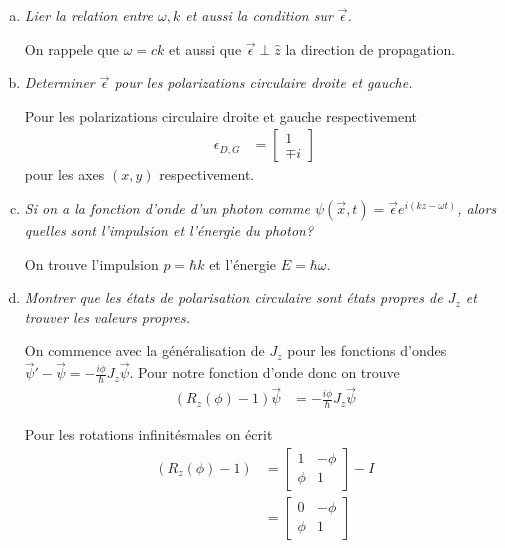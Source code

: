 \documentclass[10pt]{report}
\begin{document}
\begin{enumerate}[a)]
    \item \emph{Lier la relation entre $\omega,k$ et aussi la condition sur $\vec{\epsilon}$.}

        On rappele que $\omega = ck$ et aussi que $\vec{\epsilon} \perp \hat{z}$ la direction de propagation.
    \item \emph{Determiner $\vec{\epsilon}$ pour les polarizations circulaire droite et gauche.}

        Pour les polarizations circulaire droite et gauche respectivement
        \begin{align}
            \epsilon_{D,G} &= \begin{bmatrix} 1 \\ \mp i \end{bmatrix} 
        \end{align}
        pour les axes $(x,y)$ respectivement.

    \item \emph{Si on a la fonction d'onde d'un photon comme $\psi(\vec{x},t) = \vec{\epsilon}e^{i(kz - \omega t)}$, alors quelles sont l'impulsion et l'\'energie du photon?}

        On trouve l'impulsion $p = \hbar k$ et l'\'energie $E = \hbar \omega$.

    \item \emph{Montrer que les \'etats de polarisation circulaire sont \'etats propres de $J_z$ et trouver les valeurs propres.}

        On commence avec la g\'en\'eralisation de $J_z$ pour les fonctions d'ondes $\vec{\psi}' - \vec{\psi} = -\frac{i\phi}{\hbar}J_z\vec{\psi}$. Pour notre fonction d'onde donc on trouve
        \begin{align}
            \left( R_z(\phi) - 1 \right)\vec{\psi} &= -\frac{i\phi}{\hbar}J_z\vec{\psi}\label{08.10.eq}
        \end{align}

        Pour les rotations infinit\'esmales on \'ecrit
        \begin{align}
            \left( R_z(\phi) - 1 \right) &= \begin{bmatrix} 1 & -\phi\\ \phi & 1 \end{bmatrix}  - I\\
            &= \begin{bmatrix} 0 & -\phi\\ \phi & 1 \end{bmatrix} 
        \end{align}
        

\end{enumerate}
\end{document}
